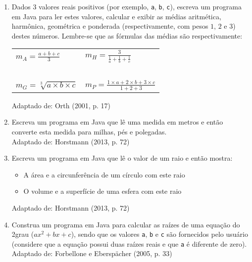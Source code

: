 \documentclass[onecolumn,a4paper,10pt]{report}
\newcommand{\+}{\, + \,}
\newcommand{\<}{\hspace*{-0.4cm}}
\begin{document}
\begin{enumerate}[1.]
\item Dados 3 valores reais positivos (por exemplo, \texttt{a}, \texttt{b}, \texttt{c}), escreva um programa em Java para ler estes valores, calcular e exibir as médias aritmética, harmônica, geométrica e ponderada (respectivamente, com pesos $1$, $2$ e $3$) destes números. Lembre-se que as fórmulas das médias são respectivamente:
\begin{center}
\begin{tabular}{p{4cm}p{5cm}}
$\displaystyle m_A = \frac{a+b+c}{3} $ & $\displaystyle m_H = \frac{3}{\frac{1}{a}+\frac{1}{b}+\frac{1}{c}} $ \\
~ & ~\\
$\displaystyle m_G = \sqrt[3]{a \times b \times c} $ & $\displaystyle m_P = \frac{1 \times a + 2 \times b + 3 \times c}{1+2+3} $ \\
\end{tabular}
\end{center}
{\tiny Adaptado de: Orth (2001, p. 17)}

\item Escreva um programa em Java que lê uma medida em metros e então converte esta medida para milhas, pés e polegadas.\\
{\tiny Adaptado de: Horstmann (2013, p. 72)}

\item Escreva um programa em Java que lê o valor de um raio e então mostra:
\begin{itemize}
	\item A área e a circunferência de um círculo com este raio
	\item O volume e a superfície de uma esfera com este raio
\end{itemize}
{\tiny Adaptado de: Horstmann (2013, p. 72)}

\item Construa um programa em Java para calcular as raízes de uma equação do 2\textdegree grau ($ax^2+bx+c$), sendo que os valores \texttt{a}, \texttt{b} e \texttt{c} são fornecidos pelo usuário (considere que a equação possui duas raízes reais e que \texttt{a} é diferente de zero).\\
{\tiny Adaptado de: Forbellone e Eberspächer (2005, p. 33)}


\end{enumerate}
\end{document}

